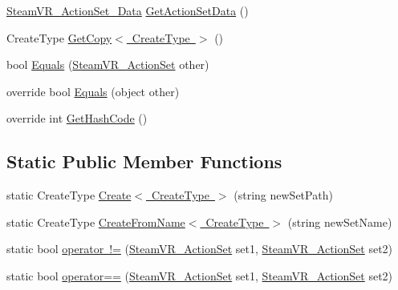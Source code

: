 \begin{DoxyCompactItemize}
\item 
\mbox{\hyperlink{class_valve_1_1_v_r_1_1_steam_v_r___action_set___data}{Steam\+V\+R\+\_\+\+Action\+Set\+\_\+\+Data}} \mbox{\hyperlink{class_valve_1_1_v_r_1_1_steam_v_r___action_set_a0c6ad358e98d8c059ef94fab25a48229}{Get\+Action\+Set\+Data}} ()
\item 
Create\+Type \mbox{\hyperlink{class_valve_1_1_v_r_1_1_steam_v_r___action_set_a9ab6363b51a1765d7d387c4cac93f401}{Get\+Copy$<$ Create\+Type $>$}} ()
\item 
bool \mbox{\hyperlink{class_valve_1_1_v_r_1_1_steam_v_r___action_set_a5758ecaf3e9b9bc26db3ba6f64cc9a39}{Equals}} (\mbox{\hyperlink{class_valve_1_1_v_r_1_1_steam_v_r___action_set}{Steam\+V\+R\+\_\+\+Action\+Set}} other)
\item 
override bool \mbox{\hyperlink{class_valve_1_1_v_r_1_1_steam_v_r___action_set_a1093904e530e05fa8b4161285bbc7a3f}{Equals}} (object other)
\item 
override int \mbox{\hyperlink{class_valve_1_1_v_r_1_1_steam_v_r___action_set_a77c22e696784714f4ce7cc3e846f1534}{Get\+Hash\+Code}} ()
\end{DoxyCompactItemize}
\subsection*{Static Public Member Functions}
\begin{DoxyCompactItemize}
\item 
static Create\+Type \mbox{\hyperlink{class_valve_1_1_v_r_1_1_steam_v_r___action_set_a2e7f4010655d5bab8525920914d564aa}{Create$<$ Create\+Type $>$}} (string new\+Set\+Path)
\item 
static Create\+Type \mbox{\hyperlink{class_valve_1_1_v_r_1_1_steam_v_r___action_set_acdc177c7f04c22b27113570985449870}{Create\+From\+Name$<$ Create\+Type $>$}} (string new\+Set\+Name)
\item 
static bool \mbox{\hyperlink{class_valve_1_1_v_r_1_1_steam_v_r___action_set_abc84b4428fef468f820c05447432f3e8}{operator !=}} (\mbox{\hyperlink{class_valve_1_1_v_r_1_1_steam_v_r___action_set}{Steam\+V\+R\+\_\+\+Action\+Set}} set1, \mbox{\hyperlink{class_valve_1_1_v_r_1_1_steam_v_r___action_set}{Steam\+V\+R\+\_\+\+Action\+Set}} set2)
\item 
static bool \mbox{\hyperlink{class_valve_1_1_v_r_1_1_steam_v_r___action_set_a3eb69b39d2ee970d0f2a4f932d5312a4}{operator==}} (\mbox{\hyperlink{class_valve_1_1_v_r_1_1_steam_v_r___action_set}{Steam\+V\+R\+\_\+\+Action\+Set}} set1, \mbox{\hyperlink{class_valve_1_1_v_r_1_1_steam_v_r___action_set}{Steam\+V\+R\+\_\+\+Action\+Set}} set2)
\end{DoxyCompactItemize}
